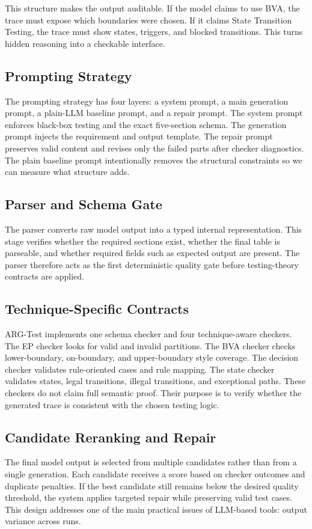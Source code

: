 \documentclass{article}
\begin{document}
This structure makes the output auditable. If the model claims to use BVA, the trace must expose which boundaries were chosen. If it claims State Transition Testing, the trace must show states, triggers, and blocked transitions. This turns hidden reasoning into a checkable interface.

\subsection{Prompting Strategy}
The prompting strategy has four layers: a system prompt, a main generation prompt, a plain-LLM baseline prompt, and a repair prompt. The system prompt enforces black-box testing and the exact five-section schema. The generation prompt injects the requirement and output template. The repair prompt preserves valid content and revises only the failed parts after checker diagnostics. The plain baseline prompt intentionally removes the structural constraints so we can measure what structure adds.

\subsection{Parser and Schema Gate}
The parser converts raw model output into a typed internal representation. This stage verifies whether the required sections exist, whether the final table is parseable, and whether required fields such as expected output are present. The parser therefore acts as the first deterministic quality gate before testing-theory contracts are applied.

\subsection{Technique-Specific Contracts}
ARG-Test implements one schema checker and four technique-aware checkers. The EP checker looks for valid and invalid partitions. The BVA checker checks lower-boundary, on-boundary, and upper-boundary style coverage. The decision checker validates rule-oriented cases and rule mapping. The state checker validates states, legal transitions, illegal transitions, and exceptional paths. These checkers do not claim full semantic proof. Their purpose is to verify whether the generated trace is consistent with the chosen testing logic.

\subsection{Candidate Reranking and Repair}
The final model output is selected from multiple candidates rather than from a single generation. Each candidate receives a score based on checker outcomes and duplicate penalties. If the best candidate still remains below the desired quality threshold, the system applies targeted repair while preserving valid test cases. This design addresses one of the main practical issues of LLM-based tools: output variance across runs.
\end{document}
